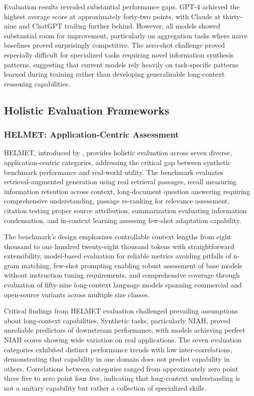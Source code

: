 Evaluation results revealed substantial performance gaps. GPT-4 achieved the highest average score at approximately forty-two points, with Claude at thirty-nine and ChatGPT trailing further behind. However, all models showed substantial room for improvement, particularly on aggregation tasks where naive baselines proved surprisingly competitive. The zero-shot challenge proved especially difficult for specialized tasks requiring novel information synthesis patterns, suggesting that current models rely heavily on task-specific patterns learned during training rather than developing generalizable long-context reasoning capabilities.

\subsection{Holistic Evaluation Frameworks}

\subsubsection{HELMET: Application-Centric Assessment}

HELMET, introduced by \citet{yen2024helmet}, provides holistic evaluation across seven diverse, application-centric categories, addressing the critical gap between synthetic benchmark performance and real-world utility. The benchmark evaluates retrieval-augmented generation using real retrieval passages, recall measuring information retention across context, long-document question answering requiring comprehensive understanding, passage re-ranking for relevance assessment, citation testing proper source attribution, summarization evaluating information condensation, and in-context learning assessing few-shot adaptation capability.

The benchmark's design emphasizes controllable context lengths from eight thousand to one hundred twenty-eight thousand tokens with straightforward extensibility, model-based evaluation for reliable metrics avoiding pitfalls of n-gram matching, few-shot prompting enabling robust assessment of base models without instruction tuning requirements, and comprehensive coverage through evaluation of fifty-nine long-context language models spanning commercial and open-source variants across multiple size classes.

Critical findings from HELMET evaluation challenged prevailing assumptions about long-context capabilities. Synthetic tasks, particularly NIAH, proved unreliable predictors of downstream performance, with models achieving perfect NIAH scores showing wide variation on real applications. The seven evaluation categories exhibited distinct performance trends with low inter-correlations, demonstrating that capability in one domain does not predict capability in others. Correlations between categories ranged from approximately zero point three five to zero point four five, indicating that long-context understanding is not a unitary capability but rather a collection of specialized skills.

